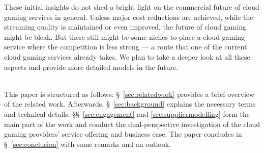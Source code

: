 These initial insights do not shed a bright light on the commercial future of cloud gaming services in general. Unless major cost reductions are achieved, while the streaming quality is maintained or even improved, the future of cloud gaming might be bleak. But there still might be some niches to place a cloud gaming service where the competition is less strong --- a route that one of the current cloud gaming services already takes. We plan to take a deeper look at all these aspects and provide more detailed models in the future.

~\\
This paper is structured as follows: §~\ref{sec:relatedwork} provides a brief overview of the related work. Afterwards, §~\ref{sec:background} explains the necessary terms and technical details. §§~\ref{sec:engagement} and \ref{sec:suppliermodelling} form the main part of the work and conduct the dual-perspective investigation of the cloud gaming providers' service offering and business case. The paper concludes in §~\ref{sec:conclusion} with some remarks and an outlook.
